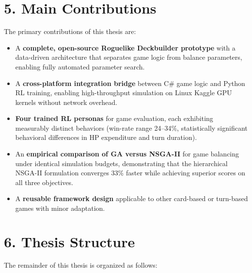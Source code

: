 \section*{5. Main Contributions}

The primary contributions of this thesis are:
\begin{itemize}
    \item A \textbf{complete, open-source Roguelike Deckbuilder prototype} with a data-driven architecture that separates game logic from balance parameters, enabling fully automated parameter search.
    \item A \textbf{cross-platform integration bridge} between C\# game logic and Python RL training, enabling high-throughput simulation on Linux Kaggle GPU kernels without network overhead.
    \item \textbf{Four trained RL personas} for game evaluation, each exhibiting measurably distinct behaviors (win-rate range 24--34\%, statistically significant behavioral differences in HP expenditure and turn duration).
    \item An \textbf{empirical comparison of GA versus NSGA-II} for game balancing under identical simulation budgets, demonstrating that the hierarchical NSGA-II formulation converges 33\% faster while achieving superior scores on all three objectives.
    \item A \textbf{reusable framework design} applicable to other card-based or turn-based games with minor adaptation.
\end{itemize}

\section*{6. Thesis Structure}

The remainder of this thesis is organized as follows:

